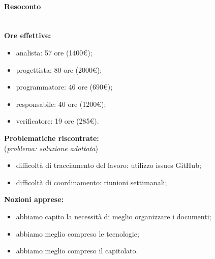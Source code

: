 \documentclass[a4paper, 12pt]{article}
\begin{document}
\paragraph{Resoconto}\\
\textbf{Ore effettive:}
\begin{itemize}
\item analista: 57 ore (1400€);
\item progettista: 80 ore (2000€);
\item programmatore: 46 ore (690€);
\item responsabile: 40 ore (1200€);
\item verificatore: 19 ore (285€).
\end{itemize}
\textbf{Problematiche riscontrate:}\\(\textit{problema: soluzione adottata})
\begin{itemize}
\item difficoltà di tracciamento del lavoro: utilizzo issues GitHub;
\item difficoltà di coordinamento: riunioni settimanali;
\end{itemize}
\textbf{Nozioni apprese:}
\begin{itemize}
\item abbiamo capito la necessità di meglio organizzare i documenti;
\item abbiamo meglio compreso le tecnologie;
\item abbiamo meglio compreso il capitolato.
\end{itemize}
\end{document}
